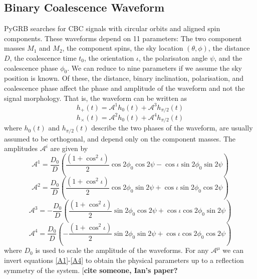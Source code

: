 \documentclass[11pt]{cuthesis}
\begin{document}
\subsection{Binary Coalescence Waveform} 
PyGRB searches for CBC signals with circular orbits and aligned spin components. These waveforms depend on 11 parameters: The two component masses $M_1$ and $M_2$, the component spins, the sky location $(\theta, \phi)$, the distance $D$, the coalescence time $t_0$, the orientation $\iota$, the polarisaton angle $\psi$, and the coalescence phase $\phi_0$. We can reduce to nine parameters if we assume the sky position is known. Of these, the distance, binary inclination, polarisation, and coalescence phase affect the phase and amplitude of the waveform and not the signal morphology. That is, the waveform can be written as
\begin{equation} \label{hp}
h_+(t) = \mathcal{A}^1 h_0(t) + \mathcal{A}^3 h_{\pi/2}(t)
\end{equation}
\begin{equation} \label{hx}
h_\times(t) = \mathcal{A}^2 h_0(t) + \mathcal{A}^4 h_{\pi/2}(t)
\end{equation}
where $h_0(t)$ and $h_{\pi/2}(t)$ describe the two phases of the waveform, are usually assumed to be orthogonal, and depend only on the component masses. The amplitudes $\mathcal{A}^i$ are given by 
\begin{equation} \label{A1}
\mathcal{A}^1 = \frac{D_0}{D} \left( \frac{(1+\cos^2 \iota)}{2} \cos 2\phi_0 \cos 2\psi -  \cos \iota \sin 2 \phi_0 \sin 2\psi \right)
\end{equation}
\begin{equation}
\mathcal{A}^2 = \frac{D_0}{D} \left( \frac{(1+\cos^2 \iota)}{2} \cos 2\phi_0 \sin 2\psi +  \cos \iota \sin 2 \phi_0 \cos 2\psi \right)
\end{equation}
\begin{equation}
\mathcal{A}^3 = -\frac{D_0}{D} \left( \frac{(1+\cos^2 \iota)}{2} \sin 2\phi_0 \cos 2\psi +  \cos \iota \cos 2 \phi_0 \sin 2\psi \right)
\end{equation}
\begin{equation} \label{A4}
\mathcal{A}^4 = \frac{D_0}{D} \left( -\frac{(1+\cos^2 \iota)}{2} \sin 2\phi_0 \sin 2\psi +  \cos \iota \cos 2 \phi_0 \cos 2\psi \right)
\end{equation}
where $D_0$ is used to scale the amplitude of the waveforms. For any $\mathcal{A}^\mu$ we can invert equations \ref{A1}-\ref{A4} to obtain the physical parameters up to a reflection symmetry of the system. [\textbf{cite someone, Ian's  paper?} 
\end{document}
